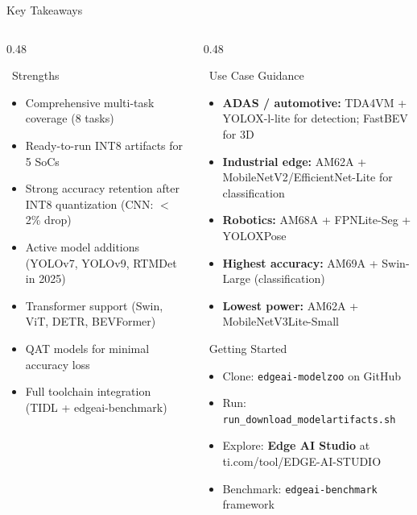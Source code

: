 \documentclass[aspectratio=169,12pt]{beamer}
\begin{document}
\begin{frame}{Key Takeaways}
  \begin{columns}[T]
    \begin{column}{0.48\textwidth}
      \begin{alertblock}{\faCheckCircle~Strengths}
        \begin{itemize}\footnotesize
          \item Comprehensive multi-task coverage (8 tasks)
          \item Ready-to-run INT8 artifacts for 5 SoCs
          \item Strong accuracy retention after INT8 quantization (CNN: $<$2\% drop)
          \item Active model additions (YOLOv7, YOLOv9, RTMDet in 2025)
          \item Transformer support (Swin, ViT, DETR, BEVFormer)
          \item QAT models for minimal accuracy loss
          \item Full toolchain integration (TIDL + edgeai-benchmark)
        \end{itemize}
      \end{alertblock}
    \end{column}

    \begin{column}{0.48\textwidth}
      \begin{exampleblock}{\faLightbulb~Use Case Guidance}
        \begin{itemize}\footnotesize
          \item \textbf{ADAS / automotive:} TDA4VM + YOLOX-l-lite for detection; FastBEV for 3D
          \item \textbf{Industrial edge:} AM62A + MobileNetV2/EfficientNet-Lite for classification
          \item \textbf{Robotics:} AM68A + FPNLite-Seg + YOLOXPose
          \item \textbf{Highest accuracy:} AM69A + Swin-Large (classification)
          \item \textbf{Lowest power:} AM62A + MobileNetV3Lite-Small
        \end{itemize}
      \end{exampleblock}

      \vspace{0.3cm}
      \begin{block}{\faLink~Getting Started}
        \begin{itemize}\scriptsize
          \item Clone: \texttt{edgeai-modelzoo} on GitHub
          \item Run: \texttt{run\_download\_modelartifacts.sh}
          \item Explore: \textbf{Edge AI Studio} at ti.com/tool/EDGE-AI-STUDIO
          \item Benchmark: \texttt{edgeai-benchmark} framework
        \end{itemize}
      \end{block}
    \end{column}
  \end{columns}
\end{frame}
\end{document}
